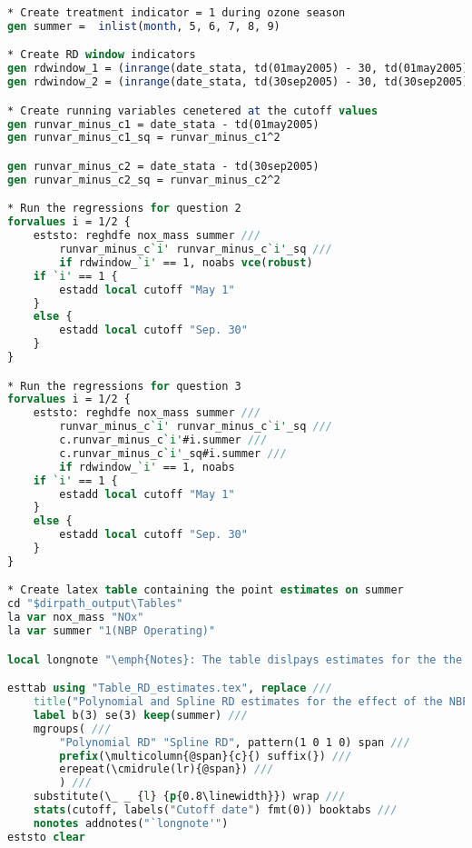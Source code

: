 \documentclass[12pt]{article}
\begin{document}
\begin{lstlisting}[language=Stata, numbers=none]
* Create treatment indicator = 1 during ozone season
gen summer =  inlist(month, 5, 6, 7, 8, 9)

* Create RD window indicators
gen rdwindow_1 = (inrange(date_stata, td(01may2005) - 30, td(01may2005) + 30))
gen rdwindow_2 = (inrange(date_stata, td(30sep2005) - 30, td(30sep2005) + 30))

* Create running variables cenetered at the cutoff values
gen runvar_minus_c1 = date_stata - td(01may2005)
gen runvar_minus_c1_sq = runvar_minus_c1^2

gen runvar_minus_c2 = date_stata - td(30sep2005)
gen runvar_minus_c2_sq = runvar_minus_c2^2

* Run the regressions for question 2
forvalues i = 1/2 {
	eststo: reghdfe nox_mass summer ///
		runvar_minus_c`i' runvar_minus_c`i'_sq ///
		if rdwindow_`i' == 1, noabs vce(robust)
	if `i' == 1 {
		estadd local cutoff "May 1"
	}
	else {
		estadd local cutoff "Sep. 30"
	}
}

* Run the regressions for question 3
forvalues i = 1/2 {
	eststo: reghdfe nox_mass summer ///
		runvar_minus_c`i' runvar_minus_c`i'_sq ///
		c.runvar_minus_c`i'#i.summer ///
		c.runvar_minus_c`i'_sq#i.summer ///
		if rdwindow_`i' == 1, noabs
	if `i' == 1 {
		estadd local cutoff "May 1"
	}
	else {
		estadd local cutoff "Sep. 30"
	}
}

* Create latex table containing the point estimates on summer
cd "$dirpath_output\Tables"
la var nox_mass "NOx"
la var summer "1(NBP Operating)"

local longnote "\emph{Notes}: The table dislpays estimates for the the effect of the NOx Budget Trading Program on average total daily NOx emissions. Columns 1--2 report the results using the polynomial regresion discontinuity, and Columns 3--4 report the results using the spline regression discontinuity. Columns 1 and 3 include the 30 days before and after May 1st in the sample, and Columns 2 and 4 include the 30 days before and after September 30th. Robust errors are in parentheses. * p<0.05, ** p<0.01, *** p<0.001"

esttab using "Table_RD_estimates.tex", replace ///
	title("Polynomial and Spline RD estimates for the effect of the NBP on NOx emissions \label{tab1}") ///
	label b(3) se(3) keep(summer) ///
	mgroups( ///
		"Polynomial RD" "Spline RD", pattern(1 0 1 0) span ///
		prefix(\multicolumn{@span}{c}{) suffix(}) ///
		erepeat(\cmidrule(lr){@span}) ///
		) ///
	substitute(\_ _ {l} {p{0.8\linewidth}}) wrap ///
	stats(cutoff, labels("Cutoff date") fmt(0)) booktabs ///
	nonotes addnotes("`longnote'")
eststo clear



\end{lstlisting}
\end{document}
